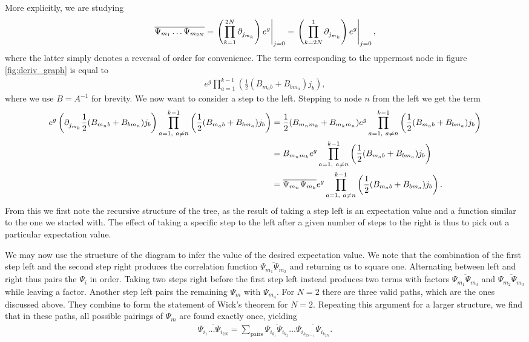 More explicitly, we are studying
\begin{align*}
	\overline{\Psi_{m_{1}}\dots\Psi_{m_{2N}}} = \eval{\left(\prod\limits_{k = 1}^{2N}\del{}{j_{m_{k}}}\right)e^{g}}_{j = 0} = \eval{\left(\prod\limits_{k = 2N}^{1}\del{}{j_{m_{k}}}\right)e^{g}}_{j = 0},
\end{align*}
where the latter simply denotes a reversal of order for convenience. The term corresponding to the uppermost node in figure \ref{fig:deriv_graph} is equal to
\begin{align*}
	e^{g}\prod\limits_{a = 1}^{k - 1}\left(\frac{1}{2}(B_{m_{a}b} + B_{bm_{a}})j_{b}\right),
\end{align*}
where we use $B = A^{-1}$ for brevity. We now want to consider a step to the left. Stepping to node $n$ from the left we get the term
\begin{align*}
	e^{g}\left(\del{}{j_{m_{k}}}\frac{1}{2}(B_{m_{n}b} + B_{bm_{n}})j_{b}\right)\prod\limits_{a = 1,\ a \neq n}^{k - 1}\left(\frac{1}{2}(B_{m_{a}b} + B_{bm_{a}})j_{b}\right) &= \frac{1}{2}(B_{m_{n}m_{k}} + B_{m_{k}m_{n}})e^{g}\prod\limits_{a = 1,\ a \neq n}^{k - 1}\left(\frac{1}{2}(B_{m_{a}b} + B_{bm_{a}})j_{b}\right) \\
	&= B_{m_{n}m_{k}}e^{g}\prod\limits_{a = 1,\ a \neq n}^{k - 1}\left(\frac{1}{2}(B_{m_{a}b} + B_{bm_{a}})j_{b}\right) \\
	&= \overline{\Psi_{m_{n}}\Psi_{m_{k}}}e^{g}\prod\limits_{a = 1,\ a \neq n}^{k - 1}\left(\frac{1}{2}(B_{m_{a}b} + B_{bm_{a}})j_{b}\right).
\end{align*}
From this we first note the recursive structure of the tree, as the result of taking a step left is an expectation value and a function similar to the one we started with. The effect of taking a specific step to the left after a given number of steps to the right is thus to pick out a particular expectation value.

We may now use the structure of the diagram to infer the value of the desired expectation value. We note that the combination of the first step left and the second step right produces the correlation function $\overline{\Psi_{m_{1}}\Psi_{m_{2}}}$ and returning us to square one. Alternating between left and right thus pairs the $\Psi_{i}$ in order. Taking two steps right before the first step left instead produces two terms with factors $\overline{\Psi_{m_{1}}\Psi_{m_{3}}}$ and $\overline{\Psi_{m_{2}}\Psi_{m_{3}}}$ while leaving a factor. Another step left pairs the remaining $\Psi_{m}$ with $\Psi_{m_{4}}$. For $N = 2$ there are three valid paths, which are the ones discussed above. They combine to form the statement of Wick's theorem for $N = 2$. Repeating this argument for a larger structure, we find that in these paths, all possible pairings of $\Psi_{m}$ are found exactly once, yielding
\begin{align*}
	\overline{\Psi_{i_{1}}\dots\Psi_{i_{2N}}} = \sum\limits_{\text{pairs}}\overline{\Psi_{i_{k_{1}}}\Psi_{i_{k_{2}}}}\dots\overline{\Psi_{i_{k_{2N - 1}}}\Psi_{i_{k_{2N}}}}.
\end{align*}


